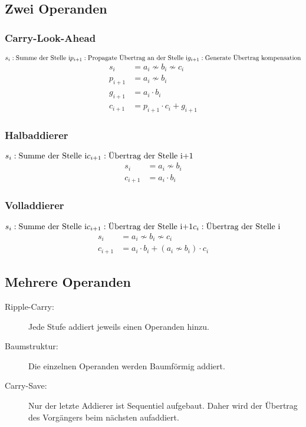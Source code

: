 \subsection{Zwei Operanden}
\begin{multicols}{2}
\raggedcolumns
	\subsubsection{Carry-Look-Ahead}
	\(
	s_i: \text{Summe der Stelle i}\\
	p_{i+1}: \text{Propagate Übertrag an der Stelle i}\\
	g_{i+1}: \text{Generate Übertrag kompensation}
	\)
	\begin{align*}
	s_i&=a_i\nsim b_i \nsim c_i\\
	p_{i+1}&=a_i\nsim b_i\\
	g_{i+1}&=a_i\cdot b_i\\
	c_{i+1}&=p_{i+1}\cdot c_i +g_{i+1}
	\end{align*}

	\subsubsection{Halbaddierer}
	\(
	s_i: \text{Summe der Stelle i}\\
	c_{i+1}: \text{Übertrag der Stelle i+1}
	\)
	\begin{align*}
	s_i&=a_i\nsim b_i\\
	c_{i+1}&=a_i \cdot b_i
	\end{align*}
		
	\subsubsection{Volladdierer}
	\(
	s_i: \text{Summe der Stelle i}\\
	c_{i+1}: \text{Übertrag der Stelle i+1}\\
	c_{i}: \text{Übertrag der Stelle i}
	\)
	\begin{align*}
	s_i&=a_i\nsim b_i \nsim c_i\\
	c_{i+1}&=a_i \cdot b_i+\left(a_i\nsim b_i\right)\cdot c_i
	\end{align*}	
\end{multicols}

\subsection{Mehrere Operanden}
\begin{description}
  	\item [Ripple-Carry:] 	Jede Stufe addiert jeweils einen Operanden hinzu.
	\item [Baumstruktur:] 	Die einzelnen Operanden werden Baumförmig addiert.
	\item [Carry-Save:]		Nur der letzte Addierer ist Sequentiel aufgebaut. Daher
							wird der Übertrag des Vorgängers beim nächsten aufaddiert.
\end{description}

